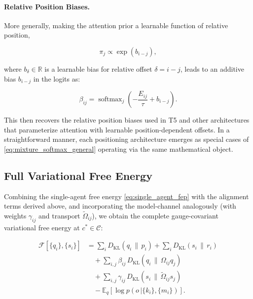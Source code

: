 \documentclass[twoside,11pt]{article}
\begin{document}
\paragraph{Relative Position Biases.}
More generally, making the attention prior a learnable function of relative position,

\begin{equation}
\pi_j \propto \exp(b_{i-j}),
\label{eq:relative_bias_prior}
\end{equation}

where $b_\delta \in \mathbb{R}$ is a learnable bias for relative offset $\delta = i - j$, leads to an additive bias $b_{i-j}$ in the logits as:

\begin{equation}
\beta_{ij} = \operatorname{softmax}_j\!\left(-\frac{E_{ij}}{\tau} + b_{i-j}\right).
\label{eq:relative_bias_attention}
\end{equation}

This then recovers the relative position biases used in T5 \citep{raffel2020exploring} and other architectures that parameterize attention with learnable position-dependent offsets. In a straightforward manner, each positioning architecture emerges as special cases of \eqref{eq:mixture_softmax_general} operating via the same mathematical object. 

\subsection{Full Variational Free Energy}
\label{sec:final_free_energy}

Combining the single-agent free energy \eqref{eq:single_agent_fep} with the alignment terms derived above, and incorporating the model-channel analogously (with weights $\gamma_{ij}$ and transport $\tilde{\Omega}_{ij}$), we obtain the complete gauge-covariant variational free energy at $c^* \in \mathcal{C}$:

\begin{equation}
\boxed{
\begin{aligned}
\mathcal{F}[\{q_i\},\{s_i\}]
&=\sum_i D_{\mathrm{KL}}(q_i\,\|\,p_i)
+\sum_i D_{\mathrm{KL}}(s_i\,\|\,r_i)\\
&\quad+\sum_{i,j}\beta_{ij}\,D_{\mathrm{KL}}(q_i\,\|\,\Omega_{ij}q_j)\\
&\quad+\sum_{i,j}\gamma_{ij}\,D_{\mathrm{KL}}(s_i\,\|\,\tilde{\Omega}_{ij}s_j)\\
&\quad-\mathbb{E}_q[\log p(o\,|\{k_i\},\{m_i\})].
\end{aligned}
}
\label{eq:free_energy_final}
\end{equation}
\end{document}
